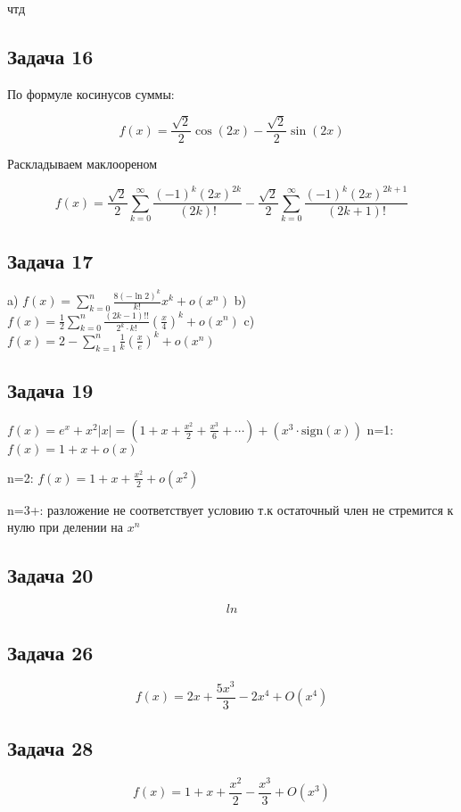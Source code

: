\documentclass[a4paper,12pt]{article}
\begin{document}
чтд

\subsection{Задача 16}

По формуле косинусов суммы:

\[
f(x) = \frac{\sqrt{2}}{2}\cos(2x) - \frac{\sqrt{2}}{2}\sin(2x)   
\]

Раскладываем маклоореном

\[
f(x) = \frac{\sqrt{2}}{2} \sum_{k=0}^{\infty} \frac{(-1)^k (2x)^{2k}}{(2k)!} - \frac{\sqrt{2}}{2} \sum_{k=0}^{\infty} \frac{(-1)^k (2x)^{2k+1}}{(2k+1)!}
\]

\subsection{Задача 17}

a) $ f(x) = \sum_{k=0}^n \frac{8(-\ln 2)^k}{k!} x^k + o(x^n) $
b) $ f(x) = \frac{1}{2} \sum_{k=0}^n \frac{(2k-1)!!}{2^k \cdot k!} \left(\frac{x}{4}\right)^k + o(x^n) $
c) $ f(x) = 2 - \sum_{k=1}^n \frac{1}{k} \left(\frac{x}{e}\right)^k + o(x^n) $


\subsection{Задача 19}

$f(x) = e^{x} + x^{2} |x| = \left(1 + x + \frac{x^{2}}{2} + \frac{x^{3}}{6} + \cdots \right) + \left(x^{3} \cdot \text{sign}(x)\right)$
n=1: $f(x) = 1 + x + o(x)$

n=2: $f(x) = 1 + x + \frac{x^2}{2} + o(x^2)$

n=3+: разложение не соответствует условию т.к остаточный член не стремится к нулю при делении на $x^n$

\subsection{Задача 20}
\[
ln
\]

\subsection{Задача 26}
\[
f(x) = 2x + \frac{5x^3}{3} - 2x^4 + O(x^4)
\]

\subsection{Задача 28}
\[
f(x) = 1 + x + \frac{x^2}{2}-\frac{x^3}{3} + O(x^3)
\]
\end{document}
